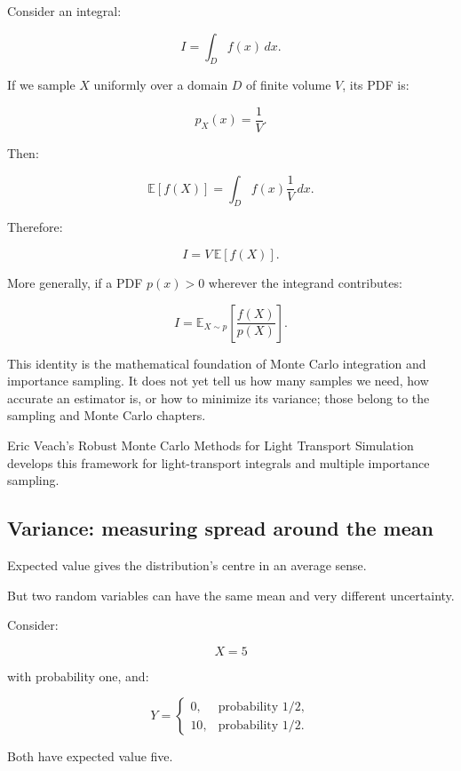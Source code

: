 \hypertarget{02-foundations-ii-ch023-expected-value-as-an-integral-the-rendering-connection}{}

Consider an integral:

\[
 I=\int_Df(x)\,dx.
\]

If we sample \(X\) uniformly over a domain \(D\) of finite volume \(V\), its PDF is:

\[
 p_X(x)=\frac1V.
\]

Then:

\[
 \mathbb E[f(X)] = \int_Df(x)\frac1V\,dx.
\]

Therefore:

\[
 \boxed{ I=V\,\mathbb E[f(X)] }.
\]

More generally, if a PDF \(p(x)>0\) wherever the integrand contributes:

\[
 \boxed{ I= \mathbb E_{X\sim p} \left[ \frac{f(X)}{p(X)} \right] }.
\]

This identity is the mathematical foundation of Monte Carlo integration and importance sampling. It does not yet tell us how many samples we need, how accurate an estimator is, or how to minimize its variance; those belong to the sampling and Monte Carlo chapters.

Eric Veach's Robust Monte Carlo Methods for Light Transport Simulation develops this framework for light-transport integrals and multiple importance sampling.

\subsection{Variance: measuring spread around the mean}\label{02-foundations-ii-ch023-variance-measuring-spread-around-the-mean}

\hypertarget{02-foundations-ii-ch023-variance-measuring-spread-around-the-mean}{}

Expected value gives the distribution's centre in an average sense.

But two random variables can have the same mean and very different uncertainty.

Consider:

\[
 X=5
\]

with probability one, and:

\[
 Y= \begin{cases} 0,&\text{probability }1/2,\\ 10,&\text{probability }1/2. \end{cases}
\]

Both have expected value five.

